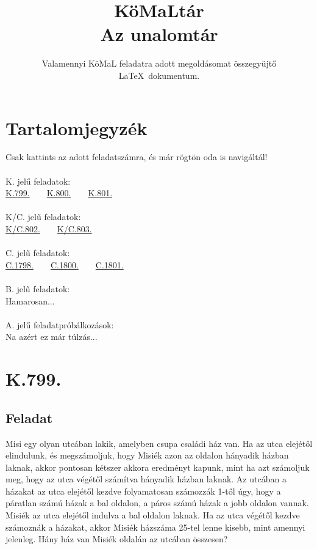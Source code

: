 \documentclass[a4paper,12pt]{article}
\title{\textbf{\Huge KöMaLtár\\\large Az unalomtár}}
\author{Valamennyi KöMaL feladatra adott megoldásomat összegyüjtő \LaTeX\ dokumentum.}
\date{} %
\begin{document}
\maketitle

\section*{Tartalomjegyzék}

Csak kattints az adott feladatszámra, és már rögtön oda is navigáltál!
\\\\ K. jelű feladatok:\\\break
\hyperref[par:1]{K.799.}\ \ \ \
\hyperref[par:2]{K.800.}\ \ \ \
\hyperref[par:3]{K.801.}\ \ \ \
\\\\ K/C. jelű feladatok:\\\break
\hyperref[par:4]{K/C.802.}\ \ \ \
\hyperref[par:5]{K/C.803.}\ \ \ \
\\\\ C. jelű feladatok:\\\break
\hyperref[par:6]{C.1798.}\ \ \ \
\hyperref[par:7]{C.1800.}\ \ \ \
\hyperref[par:8]{C.1801.}\ \ \ \
\\\\ B. jelű feladatok:\\\break
Hamarosan...
\\\\ A. jelű feladatpróbálkozások:\\
Na azért ez már túlzás...

\newpage

\section*{\Large K.799.}\label{par:1}
\subsection*{Feladat}
Misi egy olyan utcában lakik, amelyben csupa családi ház van. Ha az utca elejétől elindulunk, és megszámoljuk, hogy Misiék azon az oldalon hányadik házban laknak, akkor pontosan kétszer akkora eredményt kapunk, mint ha azt számoljuk meg, hogy az utca végétől számítva hányadik házban laknak. Az utcában a házakat az utca elejétől kezdve folyamatosan számozzák 1-től úgy, hogy a páratlan számú házak a bal oldalon, a páros számú házak a jobb oldalon vannak. Misiék az utca elejétől indulva a bal oldalon laknak. Ha az utca végétől kezdve számoznák a házakat, akkor Misiék házszáma 25-tel lenne kisebb, mint amennyi jelenleg. Hány ház van Misiék oldalán az utcában összesen? 
\end{document}
